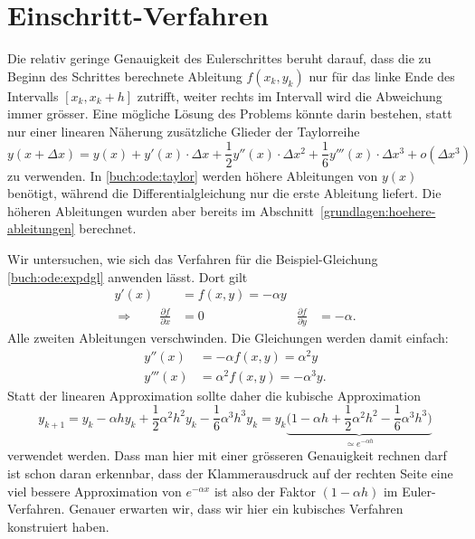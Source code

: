 %
%
%
\section{Einschritt-Verfahren\label{section:buch:ode:einschritt}}
Die relativ geringe Genauigkeit des Eulerschrittes beruht darauf,
dass die zu Beginn des Schrittes berechnete Ableitung $f(x_k,y_k)$
nur für das linke Ende des Intervalls $[x_k, x_k+h]$ zutrifft,
weiter rechts im Intervall wird die Abweichung immer grösser.
Eine mögliche Lösung des Problems könnte darin bestehen, statt
nur einer linearen Näherung zusätzliche Glieder der Taylorreihe
\begin{equation}
y(x+\Delta x)
=
y(x)
+
y'(x)\cdot \Delta x
+
\frac12 y''(x)\cdot \Delta x^2
+
\frac16 y'''(x)\cdot \Delta x^3
+
o(\Delta x^3)
\label{buch:ode:taylor}
\end{equation}
zu verwenden.
In \eqref{buch:ode:taylor} werden höhere Ableitungen von $y(x)$ benötigt,
während die Differentialgleichung nur die erste Ableitung liefert.
Die höheren Ableitungen wurden aber bereits im
Abschnitt~\ref{grundlagen:hoehere-ableitungen} berechnet.

Wir untersuchen, wie sich das Verfahren für die Beispiel-Gleichung
\eqref{buch:ode:expdgl} anwenden lässt.
Dort gilt
\begin{equation*}
\begin{aligned}
y'(x)&=f(x,y)=-\alpha y
\\
\Rightarrow\qquad
\frac{\partial f}{\partial x}&=0&\frac{\partial f}{\partial y}&=-\alpha.
\end{aligned}
\end{equation*}
Alle zweiten Ableitungen verschwinden.
Die Gleichungen werden damit einfach:
\begin{align*}
y''(x)&=-\alpha f(x,y)=\alpha^2 y
\\
y'''(x)&=\alpha^2f(x,y)=-\alpha^3 y.
\end{align*}
Statt der linearen Approximation sollte daher die kubische Approximation
\begin{equation}
y_{k+1}
=
y_{k}-\alpha h y_k +\frac12\alpha^2 h^2 y_k -\frac16 \alpha^3h^3 y_k
=
y_{k}\underbrace{\biggl(1-\alpha h +\frac12\alpha^2h^2 -\frac16 \alpha^3h^3\biggr)}_{\displaystyle \simeq e^{-\alpha h}}
\label{buch:ode:kubisch}
\end{equation}
verwendet werden.
Dass man hier mit einer grösseren Genauigkeit rechnen darf ist schon daran
erkennbar, dass der Klammerausdruck auf der rechten Seite eine viel
bessere Approximation von $e^{-\alpha x}$ ist also der Faktor
$(1-\alpha h)$ im Euler-Verfahren.
Genauer erwarten wir, dass wir hier ein kubisches Verfahren konstruiert haben.

